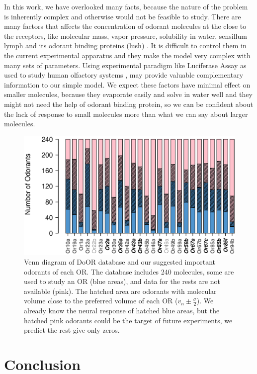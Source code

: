 \documentclass[11pt]{paper} %
\begin{document}
In this work, we have overlooked many facts, 
because the nature of the problem is inherently complex and otherwise would not be feasible to study. 
There are many factors that affects the concentration of odorant molecules at the close to the receptors, 
like molecular mass, vapor pressure, solubility in water, sensillum lymph and its odorant binding proteins (lush) \cite{}. 
It is difficult to control them in the current experimental apparatus and they make the model very complex with many sets of parameters. 
Using experimental paradigm like Luciferase Assay as used to study human olfactory systems \cite{human olf}, 
may provide valuable complementary information to our simple model. 
We expect these factors have minimal effect on smaller molecules, 
because they evaporate easily and solve in water well and they might not need the help of odorant binding protein, 
so we can be confident about the lack of response to small molecules more than what we can say about larger molecules. 

\begin{figure}
\centering
	\includegraphics[width=\textwidth]{odorant-suggest}
	\caption{Venn diagram of DoOR database and our suggested important odorants of each OR.
			The database includes 240 molecules, 
			some are used to study an OR (blue areas), 
			and data for the rests are not available (pink).
			The hatched area are odorants with molecular volume close to the preferred volume of each OR
			($v_n \pm \frac{\sigma}{2}$).
			We already know the neural response of hatched blue areas, 
			but the hatched pink odorants could be the target of future experiments, we predict the rest give only zeros.
			}
	\label{fig:odorant-suggest}
\end{figure}

\section*{Conclusion}
\end{document}
